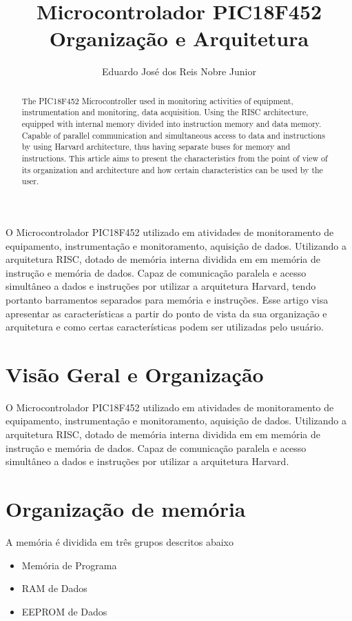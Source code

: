 \documentclass[12pt]{article}
\title{Microcontrolador PIC18F452\\Organização e Arquitetura}
\author{Eduardo José dos Reis Nobre Junior\inst{1}}
\begin{document}
 

\maketitle

\begin{abstract}
	The PIC18F452 Microcontroller used in monitoring activities of equipment, instrumentation and monitoring, data acquisition. Using the RISC architecture, equipped with internal memory divided into instruction memory and data memory. Capable of parallel communication and simultaneous access to data and instructions by using Harvard architecture, thus having separate buses for memory and instructions. This article aims to present the characteristics from the point of view of its organization and architecture and how certain characteristics can be used by the user.
\end{abstract}
     
\begin{resumo} 
	O Microcontrolador PIC18F452 utilizado em atividades de monitoramento de equipamento, instrumentação e monitoramento, aquisição de dados. Utilizando a arquitetura RISC, dotado de memória interna dividida em em memória de instrução e memória de dados. Capaz de comunicação paralela e acesso simultâneo a dados e instruções por utilizar a arquitetura Harvard, tendo portanto barramentos separados para memória e instruções.  Esse artigo visa apresentar as características a partir do ponto de vista da sua organização e arquitetura e como certas características podem ser utilizadas pelo usuário.
\end{resumo}


\section{Visão Geral e Organização}
O Microcontrolador PIC18F452 utilizado em atividades de monitoramento de equipamento, instrumentação e monitoramento, aquisição de dados. Utilizando a arquitetura RISC, dotado de memória interna dividida em em memória de instrução e memória de dados.
Capaz de comunicação paralela e acesso simultâneo a dados e instruções por utilizar a arquitetura Harvard.
\section{Organização de memória} 
A memória é dividida em três grupos descritos abaixo
\begin{itemize}
	\item Memória de Programa
	\item RAM de Dados
	\item EEPROM de Dados
\end{itemize}
\end{document}

